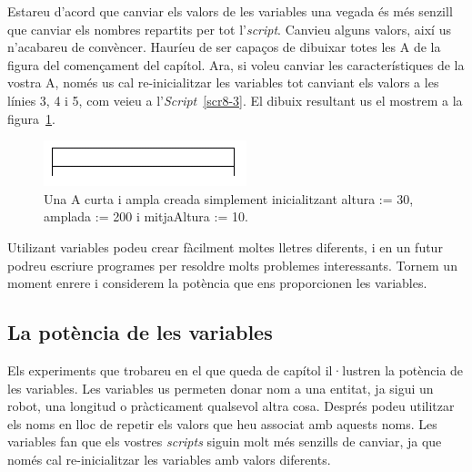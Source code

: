 Estareu d'acord que canviar els valors de les variables una vegada és més senzill que canviar els nombres repartits per tot l'\emph{script}. Canvieu alguns valors, així us n'acabareu de convèncer. Hauríeu de ser capaços de dibuixar totes les A de la figura
del començament del capítol. Ara, si voleu canviar les característiques de la vostra A, només us cal re-inicialitzar les variables tot canviant els valors a les línies 3, 4 i 5, com veieu a l'\emph{Script}~\ref{scr8-3}. El dibuix resultant us el mostrem a la figura~\ref{fig0802}.
\begin{figure}[h]
\begin{center}
\includegraphics[scale=2.0]{Imatges/figura8-2.png}
\end{center}
\caption{Una A curta i ampla creada simplement inicialitzant \textsf{\upshape altura := 30}, \textsf{\upshape amplada := 200} i \textsf{\upshape mitjaAltura := 10}.}
\label{fig0802}
\end{figure}

Utilizant variables podeu crear fàcilment moltes lletres diferents, i en un futur podreu escriure programes per resoldre molts problemes interessants. Tornem un moment enrere i considerem la potència que ens proporcionen les variables.   

\subsection{La potència de les variables}
Els experiments que trobareu en el que queda de capítol il·lustren la potència de les variables. Les variables us permeten donar nom a una entitat, ja sigui un robot, una longitud o pràcticament qualsevol altra cosa. Després podeu utilitzar els noms en lloc de repetir els valors que heu associat amb aquests noms. Les variables fan que els vostres \emph{scripts} siguin molt més senzills de canviar, ja que només cal re-inicialitzar les variables amb valors diferents.

